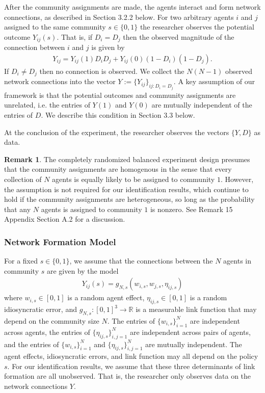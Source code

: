 \documentclass[12pt]{article}
\theoremstyle{definition}
\newtheorem{remark}{Remark}
\begin{document}
After the community assignments are made, the agents interact and form network connections, as described in Section 3.2.2 below. For two arbitrary agents $i$ and $j$ assigned to the same community $s \in \{0,1\}$ the researcher observes the potential outcome $Y_{ij}(s)$. That is, if $D_i = D_j$ then the observed magnitude of the connection between $i$ and $j$ is given by  
\begin{align*}
Y_{ij} = Y_{ij}(1)D_iD_j + Y_{ij}(0)(1-D_i)(1-D_j).
\end{align*}
If $D_i \neq D_j$ then no connection is observed. We collect the $N(N-1)$ observed network connections into the vector $Y := \{Y_{ij}\}_{ij : D_i = D_j}$. A key assumption of our framework is that the potential outcomes and community assignments are unrelated, i.e. the entries of $Y(1)$ and $Y(0)$ are mutually independent of the entries of $D$. We describe this condition in Section 3.3 below.  

At the conclusion of the experiment, the researcher observes the vectors $\{Y,D\}$ as data.  


\begin{remark}
The completely randomized balanced experiment design presumes that the community assignments are homogenous in the sense that every collection of $N$ agents is equally likely to be assigned to community $1$. However, the assumption is not required for our identification results, which continue to hold if the community assignments are heterogeneous, so long as the probability that any $N$ agents is assigned to community $1$ is nonzero. See Remark 15 Appendix Section A.2 for a discussion.  
\end{remark}


\subsubsection{Network Formation Model}
For a fixed $s \in \{0,1\}$, we assume that the connections between the $N$ agents in community $s$ are given by the model  
\begin{align}\label{model}
Y_{ij}(s) = g_{N,s}(w_{i,s},w_{j,s},\eta_{ij,s})
\end{align}
where $w_{i,s} \in [0,1]$ is a random agent effect, $\eta_{ij,s} \in [0,1]$ is a random idiosyncratic error, and $g_{N,s} : [0,1]^{3}\to \mathbb{R}$ is a measurable link function that may depend on the community size $N$. The entries of $\{w_{i,s}\}_{i=1}^{N}$ are independent across agents, the entries of  $\{\eta_{ij,s}\}_{i,j = 1}^{N}$ are independent across pairs of agents, and the entries of $\{w_{i,s}\}_{i=1}^{N}$ and $\{\eta_{ij,s}\}_{i,j = 1}^{N}$ are mutually independent. The agent effects, idiosyncratic errors, and link function may all depend on the policy $s$. For our identification results, we assume that these three determinants of link formation are all unobserved. That is, the researcher only observes data on the network connections $Y$.  
\end{document}
